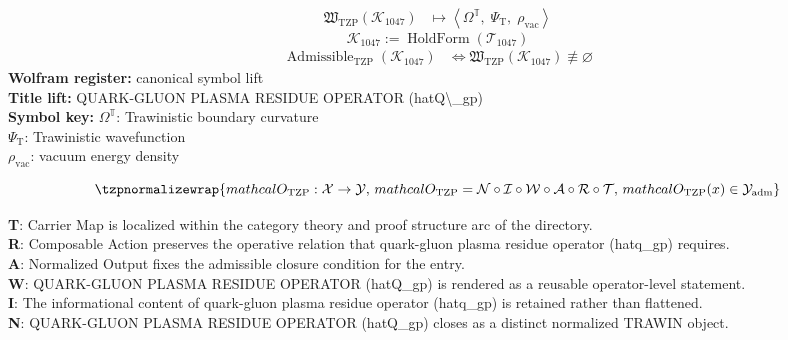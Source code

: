 \noindent
\begin{minipage}[t]{0.48\linewidth}
\begingroup
\small
\[
\begin{aligned}
\mathfrak{W}_{\mathrm{TZP}}\!\left(\mathcal{K}_{1047}\right)
&\longmapsto
\left\langle \Omega^{\mathbb{T}},\; \Psi_{\mathrm{T}},\; \rho_{\mathrm{vac}} \right\rangle
\end{aligned}
\]
\[
\mathcal{K}_{1047}
:=
\operatorname{HoldForm}\!\left(\mathcal{T}_{1047}\right)
\]
\[
\begin{aligned}
\operatorname{Admissible}_{\mathrm{TZP}}\!\left(\mathcal{K}_{1047}\right)
&\Longleftrightarrow
\mathfrak{W}_{\mathrm{TZP}}\!\left(\mathcal{K}_{1047}\right)\not\equiv\varnothing
\end{aligned}
\]
\textbf{Wolfram register:} canonical symbol lift\\
\textbf{Title lift:} QUARK-GLUON PLASMA RESIDUE OPERATOR (hatQ\textbackslash{}\_gp)\\
\textbf{Symbol key:} \(\Omega^{\mathbb{T}}\): Trawinistic boundary curvature\\ \(\Psi_{\mathrm{T}}\): Trawinistic wavefunction\\ \(\rho_{\mathrm{vac}}\): vacuum energy density
\par
\endgroup
\end{minipage}\hfill
\begin{minipage}[t]{0.48\linewidth}
\[
\tzpnormalizewrap{mathcal{O}_{\mathrm{TZP}} : \mathcal{X} \to \mathcal{Y},\,mathcal{O}_{\mathrm{TZP}} = \mathcal{N}\circ \mathcal{I}\circ \mathcal{W}\circ \mathcal{A}\circ \mathcal{R}\circ \mathcal{T},\,mathcal{O}_{\mathrm{TZP}}(x) \in \mathcal{Y}_{\mathrm{adm}}}
\]

\small
\textbf{T}: Carrier Map is localized within the category theory and proof structure arc of the directory.\\
\textbf{R}: Composable Action preserves the operative relation that quark-gluon plasma residue operator (hatq\_gp) requires.\\
\textbf{A}: Normalized Output fixes the admissible closure condition for the entry.\\
\textbf{W}: QUARK-GLUON PLASMA RESIDUE OPERATOR (hatQ\_gp) is rendered as a reusable operator-level statement.\\
\textbf{I}: The informational content of quark-gluon plasma residue operator (hatq\_gp) is retained rather than flattened.\\
\textbf{N}: QUARK-GLUON PLASMA RESIDUE OPERATOR (hatQ\_gp) closes as a distinct normalized TRAWIN object.
\normalsize
\end{minipage}


